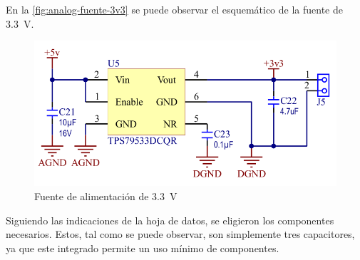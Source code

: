 \documentclass[../et.tex]{subfiles}
\begin{document}
  En la \autoref{fig:analog-fuente-3v3} se puede observar el esquemático de la fuente de \SI{3.3}{V}.

  \begin{figure}[!htbp]
    \centering
    \includegraphics[scale=0.5]{../images/analog-fuente-3v3.png}
    \caption{Fuente de alimentación de \SI{3.3}{V}}
    \label{fig:analog-fuente-3v3}
  \end{figure}

  Siguiendo las indicaciones de la hoja de datos, se eligieron los componentes necesarios. Estos, tal como se puede observar, son simplemente tres capacitores, ya que este integrado permite un uso mínimo de componentes.
\end{document}
